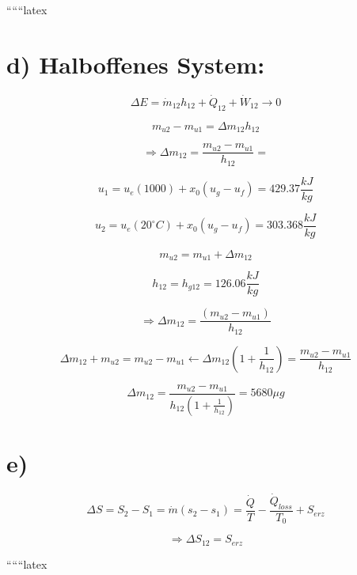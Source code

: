 ``````latex


\section*{d) Halboffenes System:}

\[
\Delta E = \dot{m}_{12} h_{12} + \dot{Q}_{12} + \dot{W}_{12} \rightarrow 0
\]

\[
m_{u2} - m_{u1} = \Delta m_{12} h_{12}
\]

\[
\Rightarrow \Delta m_{12} = \frac{m_{u2} - m_{u1}}{h_{12}} = 
\]

\[
u_1 = u_e(1000) + x_0 (u_g - u_f) = 429.37 \frac{kJ}{kg}
\]

\[
u_2 = u_e(20^\circ C) + x_0 (u_g - u_f) = 303.368 \frac{kJ}{kg}
\]

\[
m_{u2} = m_{u1} + \Delta m_{12}
\]

\[
h_{12} = h_{g12} = 126.06 \frac{kJ}{kg}
\]

\[
\Rightarrow \Delta m_{12} = \frac{(m_{u2} - m_{u1})}{h_{12}}
\]

\[
\Delta m_{12} + m_{u2} = m_{u2} - m_{u1} \leftarrow \Delta m_{12} \left(1 + \frac{1}{h_{12}}\right) = \frac{m_{u2} - m_{u1}}{h_{12}}
\]

\[
\Delta m_{12} = \frac{m_{u2} - m_{u1}}{h_{12} \left(1 + \frac{1}{h_{12}}\right)} = 5680 \mu g
\]

\section*{e)}

\[
\Delta S = S_2 - S_1 = \dot{m} (s_2 - s_1) = \frac{\dot{Q}}{T} - \frac{\dot{Q}_{loss}}{T_0} + S_{erz}
\]

\[
\Rightarrow \Delta S_{12} = S_{erz}
\]

``````latex



